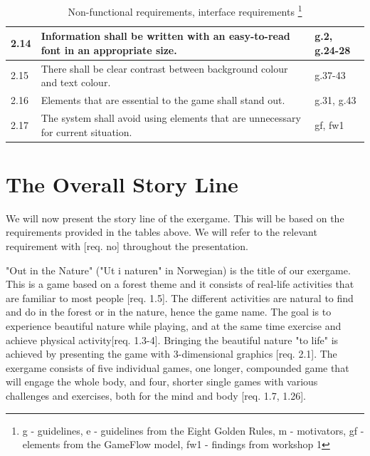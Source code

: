 \begin{minipage}{12 cm}
\begin{table} [H]
\centering
\begin{tabular}{|>{\raggedright}p{}|p{}|p{}|} 
\hline
2.14 & Information shall be written with an easy-to-read font in an appropriate size. &  g.2, g.24-28\\ \hline
2.15 & There shall be clear contrast between background colour and text colour. & g.37-43 \\ \hline
2.16 & Elements that are essential to the game shall stand out. & g.31, g.43\\ \hline
2.17 & The system shall avoid using elements that are unnecessary for current situation.  & gf, fw1\\ \hline
\end{tabular}
\caption[Non-functional requirements, part 2]{Non-functional requirements, interface requirements \footnote{g - guidelines, e - guidelines from the Eight Golden Rules, m - motivators, gf - elements from the GameFlow model, fw1 - findings from workshop 1}}
\label{tab:nonfunc2}
\end{table} 
\end{minipage}

\section{The Overall Story Line}
\label{sec:outinthenature}
We will now present the story line of the exergame. This will be based on the requirements provided in the tables above. We will refer to the relevant requirement with [req. no] throughout the presentation. 

"Out in the Nature" ("Ut i naturen" in Norwegian) is the title of our exergame. This is a game based on a forest theme and it consists of real-life activities that are familiar to most people [req. 1.5]. The different activities are natural to find and do in the forest or in the nature, hence the game name. The goal is to experience beautiful nature while playing, and at the same time exercise and achieve physical activity[req. 1.3-4]. Bringing the beautiful nature "to life" is achieved by presenting the game with 3-dimensional graphics [req. 2.1]. The exergame consists of five individual games, one longer, compounded game that will engage the whole body, and four, shorter single games with various challenges and exercises, both for the mind and body [req. 1.7, 1.26].        

